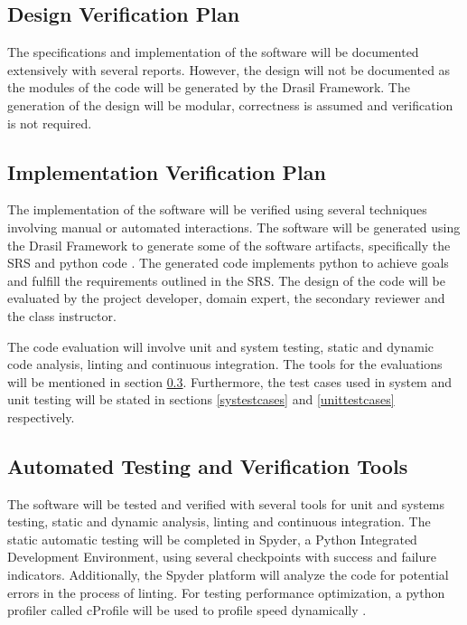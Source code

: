 \documentclass[12pt, titlepage]{article}
\begin{document}
\subsection{Design Verification Plan}

The specifications and implementation of the software will be documented 
extensively with several reports. 
However, the design will not be documented as the modules of the code will be 
generated by the Drasil Framework. The generation of the design will be modular, 
correctness is assumed and verification is not required.

\subsection{Implementation Verification Plan}

The implementation of the software will be verified using several techniques 
involving manual or automated interactions. The software will be generated using 
the Drasil Framework to generate some of the software artifacts, specifically 
the SRS and python code \citep{Drasil}. The generated code implements python to 
achieve goals and fulfill the requirements outlined in the SRS. The 
design of the code will be evaluated by the project developer, domain expert, 
the secondary reviewer and the class instructor. 

The code evaluation will involve unit and system testing, static and dynamic 
code analysis, linting and continuous integration. The tools for the evaluations 
will be mentioned in section \ref{tools}. Furthermore, the test cases used in 
system and unit testing will be stated in sections \ref{systestcases} and 
\ref{unittestcases} respectively. 


\subsection{Automated Testing and Verification Tools}\label{tools}

The \progname{} software will be tested and verified with several tools for 
unit and systems testing, static and dynamic analysis, linting and continuous 
integration. The static automatic testing will be completed in Spyder, a Python 
Integrated Development Environment, using several checkpoints with success and 
failure indicators. Additionally, the Spyder platform will analyze the code for 
potential errors in the process of linting. For testing performance optimization, a python profiler called cProfile will be used to profile speed dynamically
\citep{cProfile}.
\end{document}
